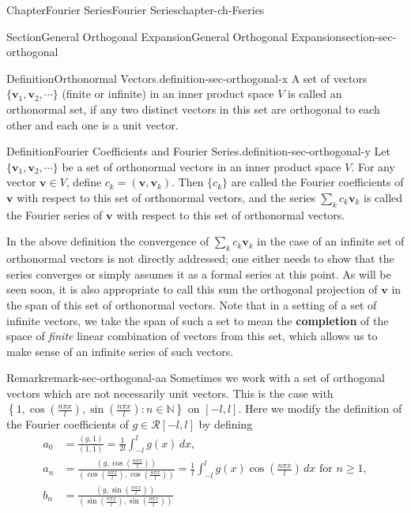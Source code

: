 \documentclass[oneside,10pt,]{book}
\newcommand{\terminology}[1]{\textbf{#1}}
\numberwithin{equation}{section}
\newcommand{\bv}{\mathbf{v}}
\newcommand{\cR}{\mathcal{R}}
\newcommand{\amp}{&}
\begin{document}
\begin{chapterptx}{Chapter}{Fourier Series}{}{Fourier Series}{}{}{chapter-ch-Fseries}
\begin{sectionptx}{Section}{General Orthogonal Expansion}{}{General Orthogonal Expansion}{}{}{section-sec-orthogonal}
\begin{definition}{Definition}{Orthonormal Vectors.}{definition-sec-orthogonal-x}%
 A set of vectors \(\{\bv_{1}, \bv_{2},\cdots \}\) (finite or infinite) in an inner product space \(V\) is called an orthonormal set, if any two distinct vectors in this set are orthogonal to each other and each one is a unit vector.\end{definition}
\begin{definition}{Definition}{Fourier Coefficients and Fourier Series.}{definition-sec-orthogonal-y}%
 Let \(\{\bv_{1}, \bv_{2},\cdots \}\) be a set of orthonormal vectors in an inner product space \(V\). For any vector \(\bv\in V\), define \(c_{k}=(\bv, \bv_{k})\). Then \(\{c_{k}\}\) are called the Fourier coefficients of \(\bv\) with respect to this set of orthonormal vectors, and the series \(\sum_{k} c_{k} \bv_{k}\) is called the Fourier series of \(\bv\) with respect to this set of orthonormal vectors.\end{definition}
In the above definition the convergence of \(\sum_{k} c_{k} \bv_{k}\) in the case of an infinite set of orthonormal vectors is not directly addressed; one either needs to show that the series converges or simply assumes it as a formal series at this point. As will be seen soon, it is also appropriate to call this sum the orthogonal projection of \(\bv\) in the span of  this set of orthonormal vectors. Note that in a setting of a set of  infinite vectors, we take  the span of such a set  to mean the \terminology{completion} of the space of \emph{finite} linear combination of vectors from this set, which allows us to make sense of an infinite series of such vectors.%
\begin{remark}{Remark}{}{remark-sec-orthogonal-aa}%
Sometimes we work with a set of orthogonal vectors which are not necessarily unit vectors. This is the case with \(\left\{ 1,  \cos \left(\frac{n \pi x}{l}\right), \sin \left(\frac{n \pi x}{l}\right) : n\in\mathbb N\right\}\) on \([-l, l]\).  Here we modify the definition of the Fourier coefficients of \(g\in \cR[-l, l]\) by defining%
\begin{align*}
a_{0} \amp = \frac{(g, 1)}{(1, 1)}=\frac {1}{2l}  \int_{-l}^{l} g(x) \, dx,\\
a_{n}\amp = \frac{(g,  \cos \left(\frac{n \pi x}{l}\right))}{(\cos \left(\frac{n \pi x}{l}\right),\cos \left(\frac{n \pi x}{l}\right))}
= \frac 1l
\int_{-l}^{l} g(x) \cos \left(\frac{n \pi x}{l}\right) \, dx \text{ for } n\ge 1,\\
b_{n} \amp =\frac{(g,  \sin \left(\frac{n \pi x}{l}\right))}{(\sin \left(\frac{n \pi x}{l}\right),\sin \left(\frac{n \pi x}{l}\right))}

\end{align*}
\end{remark}
\end{sectionptx}
\end{chapterptx}
\end{document}
